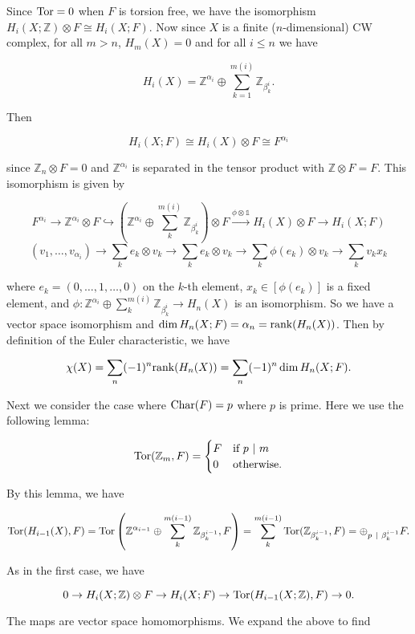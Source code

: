\documentclass{article}
\newcommand{\Z}{\mathbb{Z}}
\newcommand{\identity}{\mathds{1}}
\newcommand{\Tor}{\textnormal{Tor}}
\newcommand{\Char}{\textnormal{Char}}
\begin{document}
Since $\Tor = 0$ when $F$ is torsion free, we have the isomorphism $H_{i}(X; \Z)\otimes F\cong H_{i}(X; F)$. Now since $X$ is a finite ($n$-dimensional) CW complex, for all $m > n$, $H_{m}(X) = 0$ and for all $i\leq n$ we have

$$H_{i}(X) = \Z^{\alpha_{i}}\oplus \sum_{k=1}^{m(i)} \Z_{\beta_{k}^{i}}.$$

Then

$$H_{i}(X; F)\cong H_{i}(X)\otimes F\cong F^{\alpha_{i}}$$

since $\Z_{n}\otimes F = 0$ and $\Z^{\alpha_{i}}$ is separated in the tensor product with $\Z\otimes F = F$. This isomorphism is given by

$$F^{\alpha_{i}}\to \Z^{\alpha_{i}}\otimes F\hookrightarrow \left(\Z^{\alpha_{i}}\oplus \sum_{k}^{m(i)} \Z_{\beta_{k}^{i}}\right)\otimes F\xrightarrow{\phi\otimes \identity} H_{i}(X)\otimes F\to H_{i}(X; F)$$
$$(v_{1},\ldots, v_{\alpha_{i}})\to \sum_{k}e_{k}\otimes v_{k}\to \sum_{k}e_{k}\otimes v_{k}\to \sum_{k}\phi(e_{k})\otimes v_{k}\to \sum_{k} v_{k}x_{k}$$

where $e_{k} = (0,\ldots, 1,\ldots, 0)$ on the $k$-th element, $x_{k}\in [\phi(e_{k})]$ is a fixed element, and $\phi: \Z^{\alpha_{i}}\oplus \sum_{k}^{m(i)}\Z_{\beta_{k}^{i}}\to H_{n}(X)$ is an isomorphism. So we have a vector space isomorphism and $\dim H_{n}(X; F) = \alpha_{n} = \textnormal{rank} (H_{n}(X))$. Then by definition of the Euler characteristic, we have

$$\chi(X) = \sum_{n}(-1)^{n}\textnormal{rank}(H_{n}(X)) = \sum_{n}(-1)^{n}\dim H_{n}(X; F).$$

Next we consider the case where $\Char(F) = p$ where $p$ is prime. Here we use the following lemma:

\[\Tor(\Z_{m}, F) = \begin{cases} F & \textnormal{if } p\ |\ m\\ 0 & \textnormal{otherwise}. \end{cases}\]

By this lemma, we have

$$\Tor(H_{i-1}(X), F) = \Tor\left(\Z^{\alpha_{i-1}}\oplus \sum_{k}^{m(i-1)}\Z_{\beta_{k}^{i-1}}, F\right) = \sum_{k}^{m(i-1)} \Tor(\Z_{\beta_{k}^{i-1}}, F) = \oplus_{p\ |\ \beta_{k}^{i-1}} F.$$

As in the first case, we have

$$0\to H_{i}(X; \Z)\otimes F\to H_{i}(X; F)\to \Tor(H_{i-1}(X; \Z), F)\to 0.$$

The maps are vector space homomorphisms. We expand the above to find
\end{document}
